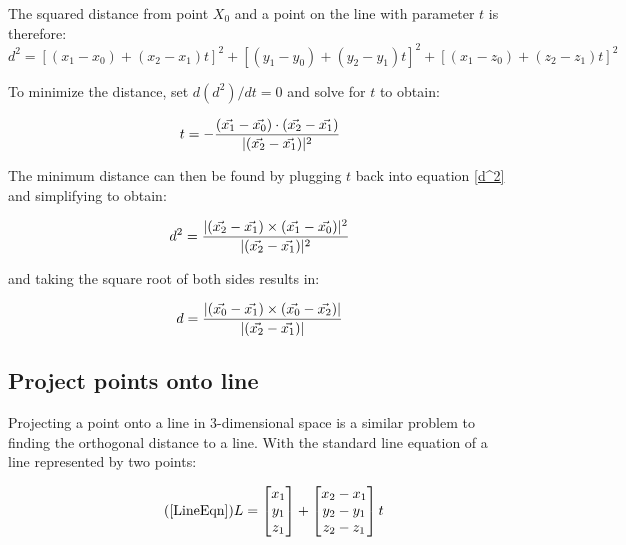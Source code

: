 	\noindent The squared distance from point $X_0$ and a point on the line with parameter $t$ is therefore:
	\begin{equation}\label{d^2}
	d^2 = [(x_1 - x_0) + (x_2 - x_1)t]^2 + [(y_1 - y_0) + (y_2 - y_1)t]^2  + [(x_1 - z_0) + (z_2 - z_1)t]^2 
	\end{equation}

	\noindent To minimize the distance, set $d(d^2)/dt = 0$ and solve for $t$ to obtain:
	
	\begin{equation}\label{formT}
	t = - \frac{(\vec{x_1} - \vec{x_0}) \cdot (\vec{x_2} - \vec{x_1})  }{\lvert (\vec{x_2} - \vec{x_1}) \rvert^2}
	\end{equation}
	
	The minimum distance can then be found by plugging $t$ back into equation \ref{d^2} and simplifying to obtain:
	
	\begin{equation}
	d^2 = \frac{ \lvert  (\vec{x_2} - \vec{x_1}) \times (\vec{x_1} - \vec{x_0}) \rvert^2  }{\lvert (\vec{x_2} - \vec{x_1}) \rvert^2}
	\end{equation}
	
	and taking the square root of both sides results in:
	
	\begin{equation}
	d = \frac{ \lvert  (\vec{x_0} - \vec{x_1}) \times (\vec{x_0} - \vec{x_2}) \rvert}{\lvert (\vec{x_2} - \vec{x_1}) \rvert}
	\end{equation}

	\subsection{Project points onto line}
	\label{ProjectionOntoLine}
	Projecting a point onto a line in 3-dimensional space is a similar problem to finding the orthogonal distance to a line. With the standard line equation of a line represented by two points:
	
	\begin{equation}\tag{\ref{LineEqn}}
		L = \begin{bmatrix}
		x_1 \\
		y_1\\
		z_1 
		\end{bmatrix} + \begin{bmatrix}
		x_2 - x_1 \\
		y_2 - y_1\\
		z_2 - z_1
		\end{bmatrix}t
	\end{equation}
	

